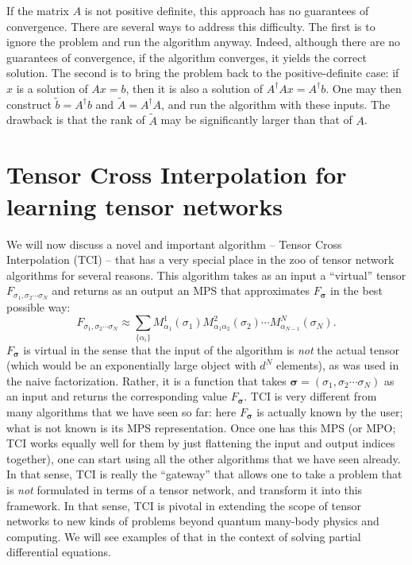 \documentclass{SciPost}
\begin{document}
If the matrix $A$ is not positive definite, this approach has no guarantees of convergence. There are several ways to address this difficulty. The first is to ignore the problem and run the algorithm anyway. Indeed, although there are no guarantees of convergence, if the algorithm converges, it yields the correct solution. The second is to bring the problem back to the positive-definite case: if $x$ is a solution of $Ax=b$, then it is also a solution of $A^\dagger A x = A^\dagger b$. One may then construct $\tilde b = A^\dagger b$ and $\tilde A = A^\dagger A$, and run the algorithm with these inputs. The drawback is that the rank of $\tilde A$ may be significantly larger than that of $A$.

\section{Tensor Cross Interpolation for learning tensor networks}
\label{sec:tci}

 We will now discuss a novel and important algorithm -- Tensor Cross Interpolation (TCI) -- that has a very special place in the zoo of tensor network algorithms for several reasons.
This algorithm takes as an input a ``virtual'' tensor
$F_{\sigma_1,\sigma_2\cdots{}\sigma_{N} }$ and returns as an output an MPS that approximates $F_\mathbf{\sigma}$ in the best possible way:
\begin{equation}
F_{\sigma_1,\sigma_2\cdots{}\sigma_{N} } \approx \sum_{\{\alpha_i\}}
M^1_{\alpha_1}(\sigma_1)
M^2_{\alpha_1\alpha_2}(\sigma_2)\cdots{}
M^{N}_{\alpha_{N-1}}(\sigma_N).
\end{equation}
$F_\mathbf{\sigma}$ is virtual in the sense that the input of the algorithm is \emph{not} the actual tensor (which would be an exponentially large object with $d^N$ elements), as was used in the naive factorization. Rather, it is a function that takes
$\mathbf{\sigma} = (\sigma_1,\sigma_2\cdots{}\sigma_{N})$ as an input and
returns the corresponding value $F_\mathbf{\sigma}$. TCI is very different from many algorithms that we have seen so far: here $F_\mathbf{\sigma}$ is actually known by the user; what is not known is its MPS representation. Once one has this MPS (or MPO; TCI works equally well for them by just flattening the input and output indices together), one can start using all the other algorithms that we have seen already. In that sense, TCI is really the ``gateway'' that allows one to take a problem that is \emph{not} formulated in terms of a tensor network, and transform it into this framework. In that sense, TCI is pivotal in extending the scope of tensor networks to new kinds of problems beyond quantum many-body physics and computing. We will see examples of that in the context of solving partial differential equations.
\end{document}
